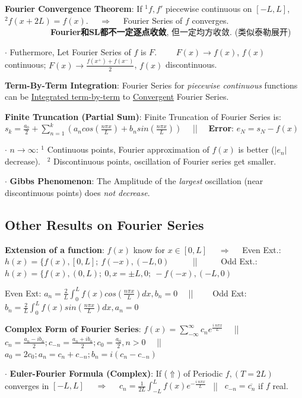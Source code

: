 \documentclass[8pt]{extarticle}
\begin{document}
\textbf{Fourier Convergence Theorem}: If $^1f,f'$ piecewise continuous on $[-L,L]$,$^2f(x+2L)=f(x)$. \ \ $\Rightarrow$ \ \ Fourier Series of $f$ converges. \ \ \ \ \ \ \ \ \ \ \ \textbf{Fourier和SL都不一定逐点收敛}, 但一定均方收敛. (类似泰勒展开)

$\cdot$ Futhermore, Let Fourier Series of $f$ is $F$. \ \ \ \ $F(x)\to f(x)$, $f(x)$ continuous; $F(x)\to\frac{f(x^+)+f(x^-)}{2}$, $f(x)$ discontinuous.

\textbf{Term-By-Term Integration}: Fourier Series for \textit{piecewise continuous} functions can be \underline{Integrated term-by-term} to \underline{Convergent} Fourier Series.

\textbf{Finite Truncation (Partial Sum)}: { Finite Truncation of Fourier Series is: $s_k=\frac{a_0}{2}+\sum_{n=1}^{k}\left(a_ncos(\frac{n\pi x}{L})+b_nsin(\frac{n\pi x}{L})\right)$ \ \ || \ \  \textbf{Error}: $e_N=s_N-f(x)$}

$\cdot$ $n\to\infty$: { $^1$ Continuous points, Fourier approximation of $f(x)$ is better ($|e_n|$ decrease). \ $^2$ Discontinuous points, oscillation of Fourier series get smaller.}

$\cdot$ \textbf{Gibbs Phenomenon}: The Amplitude of the \textit{largest} oscillation (near discontinuous points) does \textit{not decrease}.


\subsection{Other Results on Fourier Series}

\textbf{Extension of a function}: $f(x)$ know for $x\in[0,L]$ \ \ $\Rightarrow$ \ \ Even Ext.: $h(x)=\{f(x),[0,L]; \ f(-x),(-L,0)$ \ \ \ \ \ || \ \ \ \ \ Odd Ext.: $h(x)=\{f(x),(0,L); \ 0,x=\pm L,0; \ -f(-x),(-L,0)$

\hspace{140pt} Even Ext: $a_n=\frac{2}{L}\int^L_0f(x)cos(\frac{n\pi x}{L})dx,b_n=0$ \ \ || \ \ \ \ Odd Ext: $b_n=\frac{2}{L}\int^L_0f(x)sin(\frac{n\pi x}{L})dx,a_n=0$

\textbf{Complex Form of Fourier Series}: $f(x)=\sum_{-\infty}^{\infty}c_ne^{\frac{i \ n\pi x}{L}}$ \ \ || \ \ $c_n=\frac{a_n-ib_n}{2};c_{-n}=\frac{a_n+ib_n}{2};c_0=\frac{a_0}{2},n>0$ \ \ || \ \ $a_0=2c_0;a_n=c_n+c_{-n};b_n=i(c_n-c_{-n})$

$\cdot$ \textbf{Euler-Fourier Formula (Complex)}: If ($\Uparrow$) of Periodic $f,(T=2L)$ converges in $[-L,L]$ \ \ $\Rightarrow$ \ \ $c_n=\frac{1}{2L}\int_{-L}^{L}f(x)e^{-\frac{i \ n\pi x}{L}}$ \ || \ $c_{-n}=\overline{c_n}$ if $f$ real.
\end{document}
